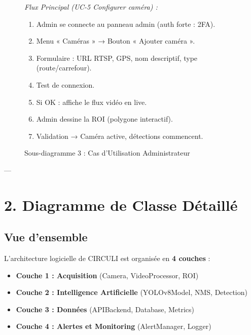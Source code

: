 \begin{figure}[H]
{\begin{minipage}{0.95\textwidth}
    \textit{Flux Principal (UC-5 Configurer caméra) :}
    \begin{enumerate}
        \item Admin se connecte au panneau admin (auth forte : 2FA).
        \item Menu « Caméras » → Bouton « Ajouter caméra ».
        \item Formulaire : URL RTSP, GPS, nom descriptif, type (route/carrefour).
        \item Test de connexion.
        \item Si OK : affiche le flux vidéo en live.
        \item Admin dessine la ROI (polygone interactif).
        \item Validation → Caméra active, détections commencent.
    \end{enumerate}
    
    \end{minipage}}
    \caption{Sous-diagramme 3 : Cas d'Utilisation Administrateur}
    \label{fig:uc-admin}
\end{figure}

---

\newpage
\section{2. Diagramme de Classe Détaillé}

\subsection{Vue d'ensemble}

L'architecture logicielle de CIRCULI est organisée en \textbf{4 couches} :
\begin{itemize}
    \item \textbf{Couche 1 : Acquisition} (Camera, VideoProcessor, ROI)
    \item \textbf{Couche 2 : Intelligence Artificielle} (YOLOv8Model, NMS, Detection)
    \item \textbf{Couche 3 : Données} (APIBackend, Database, Metrics)
    \item \textbf{Couche 4 : Alertes et Monitoring} (AlertManager, Logger)
\end{itemize}


